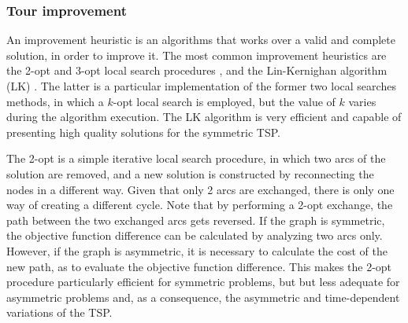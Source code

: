 \subsubsection{Tour improvement}

An improvement heuristic is an algorithms that works over a valid and complete solution, in order to improve it. The most common improvement heuristics are the 2-opt and 3-opt local search procedures \cite{lkh_original}, and the Lin-Kernighan algorithm (LK) . The latter is a particular implementation of the former two local searches methods, in which a $k$-opt local search is employed, but the value of $k$ varies during the algorithm execution. The LK algorithm is very efficient and capable of presenting high quality solutions for the symmetric TSP.

The 2-opt is a simple iterative local search procedure, in which two arcs of the solution are removed, and a new solution is constructed by reconnecting the nodes in a different way. Given that only 2 arcs are exchanged, there is only one way of creating a different cycle. Note that by performing a 2-opt exchange, the path between the two exchanged arcs gets reversed. If the graph is symmetric, the objective function difference can be calculated by analyzing two arcs only. However, if the graph is asymmetric, it is necessary to calculate the cost of the new path, as to evaluate the objective function difference. This makes the 2-opt procedure particularly efficient for symmetric problems, but but less adequate for asymmetric problems and, as a consequence, the asymmetric and time-dependent variations of the TSP. 




